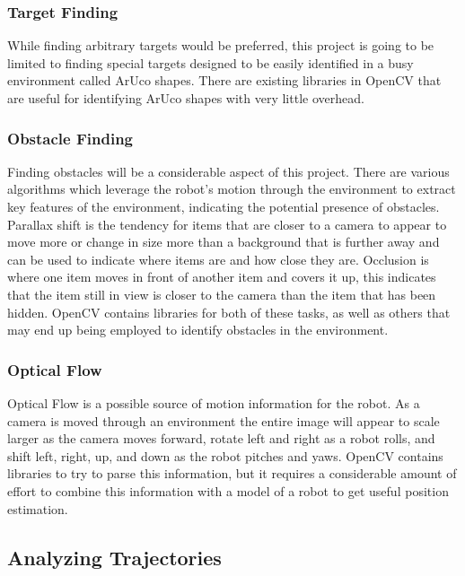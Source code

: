 \documentclass{article}
\begin{document}
		\subsubsection{Target Finding}
		
		While finding arbitrary targets would be preferred, this project is going to be limited to finding special targets designed to be easily identified in a busy environment called ArUco shapes. There are existing libraries in OpenCV that are useful for identifying ArUco shapes with very little overhead. 
		
		\subsubsection{Obstacle Finding}
		
		Finding obstacles will be a considerable aspect of this project. There are various algorithms which leverage the robot's motion through the environment to extract key features of the environment, indicating the potential presence of obstacles. Parallax shift is the tendency for items that are closer to a camera to appear to move more or change in size more than a background that is further away and can be used to indicate where items are and how close they are. Occlusion is where one item moves in front of another item and covers it up, this indicates that the item still in view is closer to the camera than the item that has been hidden. OpenCV contains libraries for both of these tasks, as well as others that may end up being employed to identify obstacles in the environment.
		
		\subsubsection{Optical Flow}
		
		Optical Flow is a possible source of motion information for the robot. As a camera is moved through an environment the entire image will appear to scale larger as the camera moves forward, rotate left and right as a robot rolls, and shift left, right, up, and down as the robot pitches and yaws. OpenCV contains libraries to try to parse this information, but it requires a considerable amount of effort to combine this information with a model of a robot to get useful position estimation.
	
	\subsection{Analyzing Trajectories}
	
\end{document}
